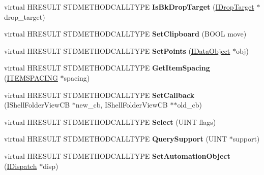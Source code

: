 \begin{DoxyCompactItemize}
\mbox{\label{class_c_def_view_a8db141559f463ecec1cb03f09d6c487a}} 
virtual H\+R\+E\+S\+U\+LT S\+T\+D\+M\+E\+T\+H\+O\+D\+C\+A\+L\+L\+T\+Y\+PE {\bfseries Is\+Bk\+Drop\+Target} (\hyperlink{interface_i_drop_target}{I\+Drop\+Target} $\ast$drop\+\_\+target)
\item 
\mbox{\label{class_c_def_view_a335744734b1986800f9d25cca22be033}} 
virtual H\+R\+E\+S\+U\+LT S\+T\+D\+M\+E\+T\+H\+O\+D\+C\+A\+L\+L\+T\+Y\+PE {\bfseries Set\+Clipboard} (B\+O\+OL move)
\item 
\mbox{\label{class_c_def_view_a70b88269ffbc6dd24a7a73f7c13a1685}} 
virtual H\+R\+E\+S\+U\+LT S\+T\+D\+M\+E\+T\+H\+O\+D\+C\+A\+L\+L\+T\+Y\+PE {\bfseries Set\+Points} (\hyperlink{interface_i_data_object}{I\+Data\+Object} $\ast$obj)
\item 
\mbox{\label{class_c_def_view_aa1f93ef91197da699ec699d528831df2}} 
virtual H\+R\+E\+S\+U\+LT S\+T\+D\+M\+E\+T\+H\+O\+D\+C\+A\+L\+L\+T\+Y\+PE {\bfseries Get\+Item\+Spacing} (\hyperlink{struct___i_t_e_m_s_p_a_c_i_n_g}{I\+T\+E\+M\+S\+P\+A\+C\+I\+NG} $\ast$spacing)
\item 
\mbox{\label{class_c_def_view_ac2a73206f4087aa516a4ad7460337d73}} 
virtual H\+R\+E\+S\+U\+LT S\+T\+D\+M\+E\+T\+H\+O\+D\+C\+A\+L\+L\+T\+Y\+PE {\bfseries Set\+Callback} (I\+Shell\+Folder\+View\+CB $\ast$new\+\_\+cb, I\+Shell\+Folder\+View\+CB $\ast$$\ast$old\+\_\+cb)
\item 
\mbox{\label{class_c_def_view_afdd35e822e4616df0212192b39759bdf}} 
virtual H\+R\+E\+S\+U\+LT S\+T\+D\+M\+E\+T\+H\+O\+D\+C\+A\+L\+L\+T\+Y\+PE {\bfseries Select} (U\+I\+NT flags)
\item 
\mbox{\label{class_c_def_view_a9a1f6e09a9c327328cffba07bad2c1ac}} 
virtual H\+R\+E\+S\+U\+LT S\+T\+D\+M\+E\+T\+H\+O\+D\+C\+A\+L\+L\+T\+Y\+PE {\bfseries Query\+Support} (U\+I\+NT $\ast$support)
\item 
\mbox{\label{class_c_def_view_af280663f0ca065a2dae3aeec471ef8d7}} 
virtual H\+R\+E\+S\+U\+LT S\+T\+D\+M\+E\+T\+H\+O\+D\+C\+A\+L\+L\+T\+Y\+PE {\bfseries Set\+Automation\+Object} (\hyperlink{interface_i_dispatch}{I\+Dispatch} $\ast$disp)
$$
\end{DoxyCompactItemize}

